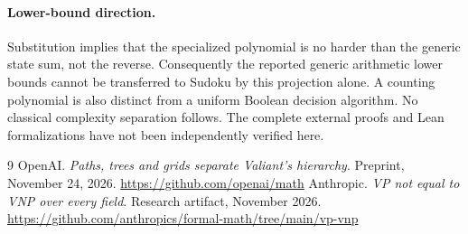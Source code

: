 \documentclass[11pt,a4paper]{article}
\begin{document}
\paragraph{Lower-bound direction.} Substitution implies that the specialized polynomial is no harder than the generic state sum, not the reverse. Consequently the reported generic arithmetic lower bounds \cite{openai,anthropic} cannot be transferred to Sudoku by this projection alone. A counting polynomial is also distinct from a uniform Boolean decision algorithm. No classical complexity separation follows. The complete external proofs and Lean formalizations have not been independently verified here.
\begin{thebibliography}{9}
 OpenAI. \emph{Paths, trees and grids separate Valiant's hierarchy}. Preprint, November 24, 2026. \url{https://github.com/openai/math}
 Anthropic. \emph{VP not equal to VNP over every field}. Research artifact, November 2026. \url{https://github.com/anthropics/formal-math/tree/main/vp-vnp}
\end{thebibliography}
\end{document}
